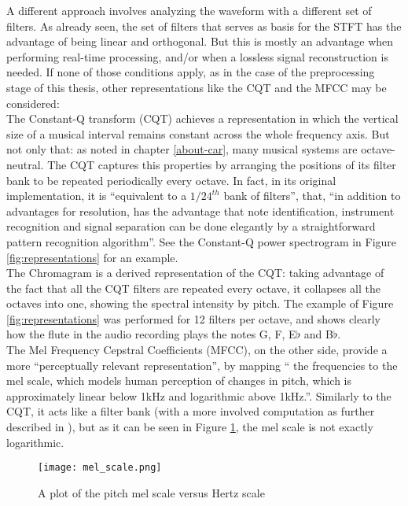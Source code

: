  A different approach involves analyzing the waveform with a different set of filters. As already seen, the set of filters that serves as basis for the STFT has the advantage of being linear and orthogonal. But this is mostly an advantage when performing real-time processing, and/or when a lossless signal reconstruction is needed. If none of those conditions apply, as in the case of the preprocessing stage of this thesis, other representations like the CQT and the MFCC may be considered:\\

  The Constant-Q transform (CQT) achieves a representation in which the vertical size of a musical interval remains constant across the whole frequency axis. But not only that: as noted in chapter \ref{about-car}, many musical systems are octave-neutral. The CQT captures this properties by arranging the positions of its filter bank to be repeated periodically every octave. In fact, in its original implementation\cite{cqt}, it is ``equivalent to a \(1/24^{th}\) bank of filters'', that, ``in addition to advantages for resolution, has the advantage that note identification, instrument recognition and signal separation can be done elegantly by a straightforward pattern recognition algorithm''\cite{cqt}. See the Constant-Q power spectrogram in Figure \ref{fig:representations} for an example.\\

  The Chromagram is a derived representation of the CQT: taking advantage of the fact that all the CQT filters are repeated every octave, it collapses all the octaves into one, showing the spectral intensity by pitch. The example of Figure \ref{fig:representations} was performed for 12 filters per octave, and shows clearly how the flute in the audio recording plays the notes G, F,  E${\flat}$ and B${\flat}$.\\


  The Mel Frequency Cepstral Coefficients (MFCC), on the other side, provide a more ``perceptually relevant representation''\cite{choi-robustness}, by  mapping `` the frequencies to the mel scale, which models human perception of changes in pitch, which is approximately linear below 1kHz and logarithmic above 1kHz.''\cite{haggblade}. Similarly to the CQT, it acts like a filter bank (with a more involved computation as further described in \cite{haggblade}), but as it can be seen in Figure \ref{fig:melscale}, the mel scale is not exactly logarithmic.\\

  \begin{figure}[h]
    \centering
    \texttt{[image: mel\_scale.png]}
    \caption{A plot of the pitch mel scale versus Hertz scale}
    \label{fig:melscale}
  \end{figure}

